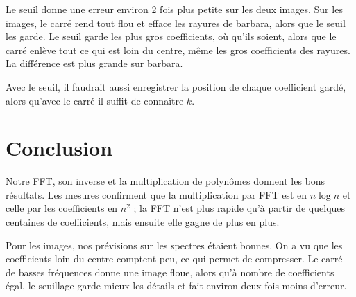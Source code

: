 \documentclass[11pt,a4paper]{article}
\begin{document}
Le seuil donne une erreur environ 2 fois plus petite sur les deux images. Sur les
images, le carré rend tout flou et efface les rayures de barbara, alors que le seuil
les garde. Le seuil garde les plus gros coefficients, où qu'ils
soient, alors que le carré enlève tout ce qui est loin du centre, même les gros
coefficients des rayures. La différence est plus grande sur barbara.

Avec le seuil, il faudrait aussi enregistrer la position de chaque
coefficient gardé, alors qu'avec le carré il suffit de connaître $k$.

\section{Conclusion}

Notre FFT, son inverse et la multiplication de polynômes donnent les bons résultats.
Les mesures confirment que la multiplication par FFT est en $n \log n$ et celle par
les coefficients en $n^2$ ; la FFT n'est plus rapide qu'à partir de quelques
centaines de coefficients, mais ensuite elle gagne de plus en plus.

Pour les images, nos prévisions sur les spectres étaient bonnes. On a vu que les
coefficients loin du centre comptent peu, ce qui permet de compresser. Le carré de
basses fréquences donne une image floue, alors qu'à nombre de coefficients égal, le
seuillage garde mieux les détails et fait environ deux fois moins d'erreur.
\end{document}
